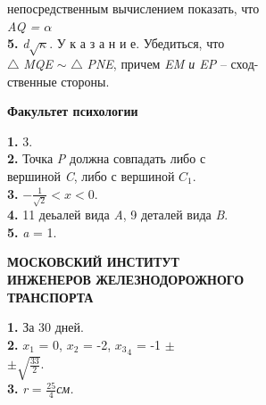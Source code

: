\begin{minipage}[b]{0.62\textwidth}
	\normalsize \hphantom\qquad\qquad непосредственным вычислением показать, что\\
	\hphantom\qquad\qquad \textit{AQ = $\alpha$}\\
	\hphantom\qquad\qquad \hphantom\qquad \textbf{5.} \textit{d$\sqrt{\kappa}$}. У к а з а н и е. Убедиться, что\\
	\hphantom\qquad\qquad $\triangle$ \textit{MQE} $\sim$ $\triangle$ \textit{PNE}, причем \textit{EM и EP} -- сход-\\
	\hphantom\qquad\qquad ственные стороны.

	\begin{center}
		\textbf{Факультет психологии}\\
	\end{center}

	\hphantom\qquad\qquad \hphantom\qquad \textbf{1.} 3.\\
	\hphantom\qquad\qquad \hphantom\qquad \textbf{2.} Точка \textit{P} должна совпадать либо с\\
	\hphantom\qquad\qquad \hphantom\qquad вершиной \textit{C}, либо с вершиной \textit{$C_1$}.\\
	\hphantom\qquad\qquad \hphantom\qquad \textbf{3.} $-\frac{1}{\sqrt{2}}<x<0$.\\
	\hphantom\qquad\qquad \hphantom\qquad \textbf{4.} 11 деьалей вида \textit{A}, 9 деталей вида \textit{B}.\\
	\hphantom\qquad\qquad \hphantom\qquad \textbf{5.} \textit{a} = 1.

	\begin{center}
		\textbf{МОСКОВСКИЙ ИНСТИТУТ\\
		ИНЖЕНЕРОВ ЖЕЛЕЗНОДОРОЖНОГО\\
		ТРАНСПОРТА}\\
	\end{center}

	\hphantom\qquad\qquad \hphantom\qquad \textbf{1.} За 30 дней.\\
	\hphantom\qquad\qquad \hphantom\qquad \textbf{2.} $x_1$ = 0, $x_2$ = -2, \qquad ${x_3}_4$ = -1 $\pm$\\
	\hphantom\qquad\qquad $\pm\sqrt{\frac{33}{2}}$.\\
	\hphantom\qquad\qquad \hphantom\qquad \textbf{3.} \textit{r} = $\frac{25}{4}$\textit{см.}\\
	\\
	\\
	\\
	\\
	\\
	\\
	\\	
	\\
\end{minipage}
